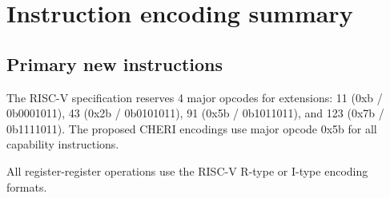{
\setlength{\parindent}{0cm}




\chapter{Instruction encoding summary}
\label{app:isaquick-riscv}

	\section{Primary new instructions}

		The RISC-V specification reserves 4 major opcodes for extensions: 11 (0xb / 0b0001011), 43 (0x2b / 0b0101011), 91 (0x5b / 0b1011011), and 123 (0x7b / 0b1111011).
		The proposed CHERI encodings use major opcode 0x5b for all capability instructions.

		All register-register operations use the RISC-V R-type or I-type encoding formats.

		\rvcheriheader









		\rvcheriheader












}
